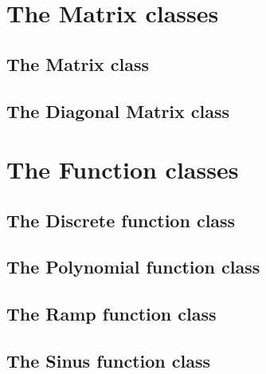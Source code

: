 \section{The Matrix classes}

\subsection{The Matrix class}

\subsection{The Diagonal Matrix class}

\section{The Function classes}

\subsection{The Discrete function class}

\subsection{The Polynomial function class}

\subsection{The Ramp function class}

\subsection{The Sinus function class}
